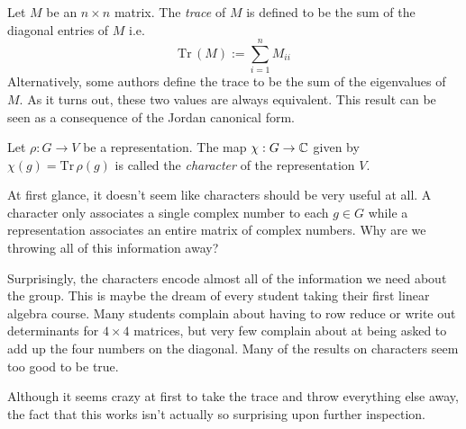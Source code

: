 
\def\Tr{\text{Tr}\,}

\begin{definition}
    Let $M$ be an $n \times n$ matrix. The \emph{trace} of $M$ is defined to be the sum of the diagonal entries of 
    $M$ i.e.
    \[
        \Tr(M) := \sum_{i=1}^n M_{ii}
    \]
    Alternatively, some authors define the trace to be the sum of the eigenvalues of $M$. As it turns out, these 
    two values are always equivalent. This result can be seen as a consequence of the Jordan canonical form.
\end{definition}

\begin{definition}
    Let $\rho : G \rightarrow V$ be a representation. The map $\chi : G \rightarrow \mathbb{C}$ given by $\chi(g) = 
    \text{Tr}\,\rho(g)$ is called the \emph{character} of the representation $V$.
\end{definition}

At first glance, it doesn't seem like characters should be very useful at all. A character only associates a single 
complex number to each $g \in G$ while a representation associates an entire matrix of complex numbers. Why are we 
throwing all of this information away?

Surprisingly, the characters encode almost all of the information we need about the group. This is maybe the dream 
of every student taking their first linear algebra course. Many students complain about having to row reduce or 
write out determinants for $4 \times 4$ matrices, but very few complain about at being asked to add up the four 
numbers on the diagonal.  Many of the results on characters seem too good to be true.

Although it seems crazy at first to take the trace and throw everything else away, the fact that this works isn't 
actually so surprising upon further inspection.

    


